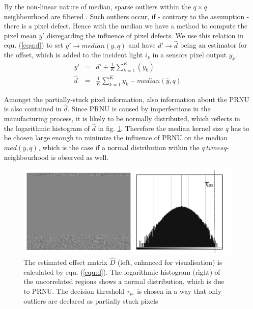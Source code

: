 \documentclass[10pt,twocolumn,letterpaper]{article}
\begin{document}
By the non-linear nature of median, sparse outliers within the $q \times q$ neighbourhood are filtered  \cite{fridrich}. Such outliers occur, if - contrary to the assumption - there is a pixel defect. Hence with the median we have a method to compute the pixel mean $\bar{y}'$ disregarding the influence of pixel defects. We use this relation in equ. (\ref{equ:d}) to set $\bar{y}' \rightarrow median(y,q)$ and have $d' \rightarrow \hat{d}$ being an estimator for the offset, which is added to the incident light $i_k$ in a sensors pixel output $y_k$.
\begin{eqnarray}
\bar{y}' & = & d'+\frac{1}{K}\sum\limits_{k=1}^{K}(y_k) \label{equ:modelWithD} \\
\hat{d} & = & \frac{1}{K}\sum\limits_{k=1}^{K}y_k - median(\bar{y},q) \label{equ:d}
\end{eqnarray}

Amongst the partially-stuck pixel information, also information about the PRNU is also contained in $\hat{d}$. Since PRNU is caused by imperfections in the manufacturing process, it is likely to be normally distributed, which reflects in the logarithmic histogram of $\hat{d}$ in fig. \ref{fig:defectMat}. Therefore the median kernel size $q$ has to be chosen large enough to minimize the influence of PRNU on the median $med(\bar{y},q)$, which is the case if a normal distribution within the $q \ times q$-neighbourhood is observed as well.

\begin{figure}
  \centering
  \includegraphics[width=\linewidth]{img/defectMatWithTau.png}
  \caption{The estimated offset matrix $\hat{D}$ (left, enhanced for visualisation) is calculated by equ. (\ref{equ:d}). The logarithmic histogram (right) of the uncorrelated regions shows a normal distribution, which is due to PRNU. The decision threshold $\tau_{ps}$ is chosen in a way that only outliers are declared as partially stuck pixels}
  \label{fig:defectMat}
\end{figure}
\end{document}
